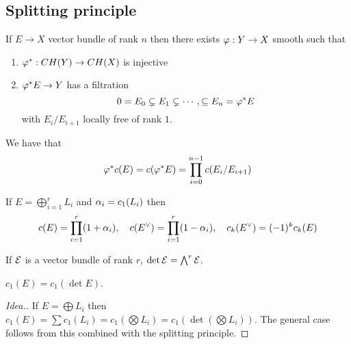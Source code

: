 \subsection{Splitting principle}

\begin{theorem}
If $E\to X$ vector bundle of rank $n$ then there exists $\varphi:Y\to X$ smooth such that 
\begin{enumerate}
    \item $\varphi^\ast:CH(Y)\to CH(X)$ is injective
    \item $\varphi^\ast E\to Y$ has a filtration
    \[0=E_0\subsetneq E_1\subsetneq\cdots, \subseteq E_n=\varphi^\ast E\]
    with $E_i/E_{i+1}$ locally free of rank $1$.
\end{enumerate}	
\end{theorem}


\begin{corollary}[]
We have that
\[\varphi^\ast c(E)=c(\varphi^\ast E)=\prod_{i=0}^{n-1} c(E_i/E_{i+1})\]
\end{corollary}

\begin{example}
If $E=\bigoplus_{i=1}^r L_i$ and $\alpha_i=c_1(L_i)$ then
\[c(E)=\prod_{i=1}^r(1+\alpha_i),\quad c(E^\vee)=\prod_{i=1}^r(1-\alpha_i),\quad c_k(E^\vee)=(-1)^kc_k(E)\]
\end{example}


\begin{definition}[]
If $\mathcal{E}$ is a vector bundle of rank $r$, $\det \mathcal{E}=\bigwedge^r\mathcal{E}$.
\end{definition}

\begin{proposition}[]
$c_1(E)=c_1(\det E)$.
\end{proposition}
\begin{proof}[Idea.]
If $E=\bigoplus L_i$ then $c_1(E)=\sum c_1(L_i)=c_1(\bigotimes L_i)=c_1(\det(\bigotimes L_i))$. The general case follows from this combined with the splitting principle.
\end{proof}














